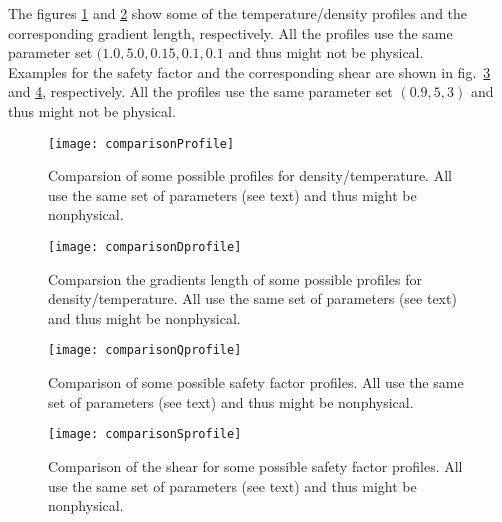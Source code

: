 The figures \ref{comparisonProfile} and \ref{comparisonDprofile} show some of
the temperature/density profiles and the corresponding gradient length, respectively.
All the profiles use the same parameter set $(1.0, 5.0, 0.15, 0.1, 0.1$ and
thus might not be physical.\\
Examples for the safety factor and the corresponding shear are shown in fig.~\ref{comparisonQprofile}
and \ref{comparisonSprofile}, respectively. All the profiles use the same
parameter set $(0.9, 5, 3)$ and thus might not be physical.

\begin{figure}
  \begin{center}
    \texttt{[image: comparisonProfile]}
    \caption{\label{comparisonProfile}Comparsion of some possible profiles for density/temperature. All use the same set of parameters (see text) and thus might be nonphysical.}
  \end{center}
\end{figure}

\begin{figure}
  \begin{center}
    \texttt{[image: comparisonDprofile]}
    \caption{\label{comparisonDprofile}Comparsion the gradients length of some possible profiles for density/temperature. All use the same set of parameters (see text) and thus might be nonphysical.}
  \end{center}
\end{figure}

\begin{figure}
  \begin{center}
    \texttt{[image: comparisonQprofile]}
    \caption{\label{comparisonQprofile}Comparison of some possible safety factor profiles. All use the same set of parameters (see text) and thus might be nonphysical.}
  \end{center}
\end{figure}

\begin{figure}
  \begin{center}
    \texttt{[image: comparisonSprofile]}
    \caption{\label{comparisonSprofile}Comparison of the shear for some possible safety factor profiles. All use the same set of parameters (see text) and thus might be nonphysical.}
  \end{center}
\end{figure}



